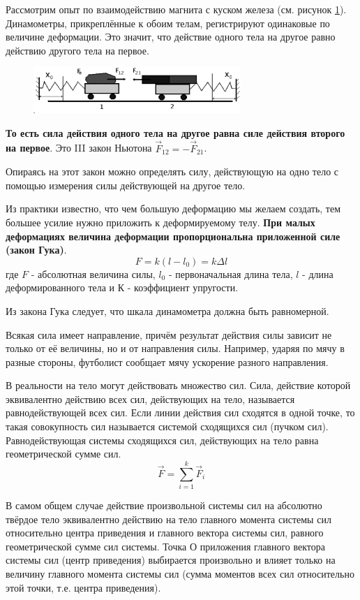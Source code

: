 \documentclass[a5paper, 10pt]{diss_4}
\renewcommand{\'}{\,'}
\begin{document}
  Рассмотрим опыт по взаимодействию магнита с куском железа (см.
рисунок \ref{rm}). Динамометры, прикреплённые к обоим телам, регистрируют одинаковые по
величине деформации. Это значит, что действие одного тела на другое равно
действию другого тела на первое.

\begin{figure}
\begin{center}
  \includegraphics[width=0.7\textwidth]{img/ris_25.eps}\\
\end{center}
\caption{}\label{rm}
\end{figure}

\textbf{То есть сила действия одного тела на другое
равна силе действия второго на первое}.
Это III закон Ньютона $\vec{F}_{12}=-\vec{F}_{21}$.

  Опираясь на этот закон можно определять силу, действующую на одно тело с
помощью измерения силы действующей на другое тело.

  Из практики известно, что чем большую деформацию мы желаем создать, тем
большее усилие нужно приложить к деформируемому телу. \textbf{При малых деформациях
величина деформации пропорциональна приложенной силе (закон Гука)}.
\[
F=k(l-l_0)=k\Delta l
\]
 где $F$ - абсолютная величина силы, $l_0$ - первоначальная длина тела, $l$ -
длина деформированного тела и $К$ - коэффициент упругости.

  Из закона Гука следует, что шкала динамометра должна быть равномерной.

  Всякая сила имеет направление, причём результат действия силы зависит не
только от её величины, но и от направления силы. Например, ударяя по мячу в
разные стороны, футболист сообщает мячу ускорение разного направления.

  В реальности на тело могут действовать множество сил. Сила, действие
которой эквивалентно действию всех сил, действующих на тело, называется
равнодействующей всех сил. Если линии действия сил сходятся в одной точке, то
такая совокупность сил называется системой сходящихся сил (пучком сил).
Равнодействующая системы сходящихся сил, действующих на тело равна
геометрической сумме сил.
\[
\vec{F}=\sum\limits_{i=1}^{k}\vec{F}_i
\]

  В самом общем случае действие произвольной системы сил на абсолютно
твёрдое тело эквивалентно действию на тело главного момента системы сил
относительно центра приведения и главного вектора системы сил, равного
геометрической сумме сил системы. Точка О приложения главного вектора системы
сил (центр приведения) выбирается произвольно и влияет только на величину
главного момента системы сил (сумма моментов всех сил относительно этой точки,
т.е. центра приведения).
\end{document}
